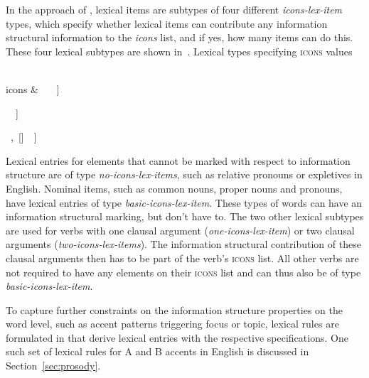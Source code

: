 \documentclass[output=paper
                ,modfonts
                ,nonflat
	        ,collection
	        ,collectionchapter
	        ,collectiontoclongg
 	        ,biblatex
                ,babelshorthands
                ,newtxmath
                ,draftmode
                ,colorlinks, citecolor=brown
]{./langsci/langscibook}
\begin{document}
In the approach of \cite{song2018}, lexical items are subtypes of four
different \textit{icons-lex-item} types, which specify whether
lexical items can contribute any information structural information to
the \textit{icons} list, and if yes, how many items can do this. These four lexical
subtypes are shown in~.
\ea
\label{ex:song-icons-lex}
Lexical types specifying \textsc{icons} values \citep[137]{song2018}
\ea
\begin{avm}
  [\tp{no-icons-lex-item}\\
  mkg & [fc & na\\tp & na]\\
  icons & \<\ \normalfont{!}\ \normalfont{!}\ \>]
\end{avm}
\ex
\begin{avm}
\end{avm}
\ex
\begin{avm}
  [\tp{one-icons-lex-item}\\
  icons & \<\ \normalfont{!}\ []\ \normalfont{!}\ \>]
\end{avm}
\ex
\begin{avm}
  [\tp{two-icons-lex-item}\\
  icons & \<\ \normalfont{!}\ []\ ,\ []\ \normalfont{!}\ \>]
\end{avm}
\z
\z

Lexical entries for elements that cannot be marked with respect to
information structure are of type \textit{no-icons-lex-items}, such as
relative pronouns or expletives in English.  Nominal items, such as
common nouns, proper nouns and pronouns, have lexical entries of type
\textit{basic-icons-lex-item}. These types of words can have an
information structural marking, but don't have to. The two other
lexical subtypes are used for verbs with one clausal argument
(\textit{one-icons-lex-item}) or two clausal arguments
(\textit{two-icons-lex-items}). The information structural
contribution of these clausal arguments then has to be part of the
verb's \textsc{icons} list. All other verbs are not required to have any
elements on their \textsc{icons} list and can thus also be of type
\textit{basic-icons-lex-item}.

To capture further constraints on the information structure properties
on the word level, such as accent patterns triggering focus or topic,
lexical rules are formulated in \cite{song2018} that derive lexical entries with the
respective specifications. One such set of lexical rules for A and B
accents in English is discussed in Section~\ref{sec:prosody}.
\end{document}
